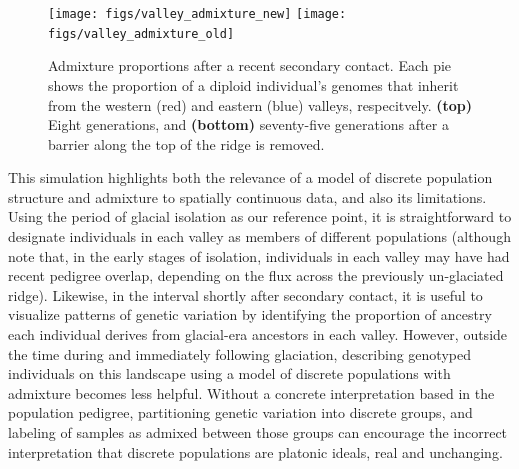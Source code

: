 \documentclass{ar-1col}
\begin{document}
\begin{figure}	%
    \centering
        \texttt{[image: figs/valley\_admixture\_new]}
        \texttt{[image: figs/valley\_admixture\_old]}
        \caption{
            Admixture proportions after a recent secondary contact.
            Each pie shows the proportion of a diploid individual's genomes
            that inherit from the western (red) and eastern (blue) valleys, respecitvely.
            \textbf{(top)} Eight generations, and
            \textbf{(bottom)} seventy-five generations 
            after a barrier along the top of the ridge is removed.
        }
        \label{postglacial_expansion}
\end{figure}

This simulation highlights both the relevance of 
a model of discrete population structure and admixture
to spatially continuous data, 
and also its limitations.
Using the period of glacial isolation as our reference point, 
it is straightforward to designate individuals in each valley 
as members of different populations 
(although note that, in the early stages of isolation, 
individuals in each valley may have had recent pedigree overlap, 
depending on the flux across the previously un-glaciated ridge).
Likewise, 
in the interval shortly after secondary contact, 
it is useful to visualize patterns of genetic variation 
by identifying the proportion of ancestry 
each individual derives from glacial-era ancestors in each valley.
However, 
outside the time during and immediately following glaciation, 
describing genotyped individuals on this landscape 
using a model of discrete populations with admixture 
becomes less helpful.
Without a concrete interpretation based in the population pedigree,
partitioning genetic variation into discrete groups, 
and labeling of samples as admixed between those groups
can encourage the incorrect interpretation that discrete populations are platonic ideals,
real and unchanging.
\end{document}
